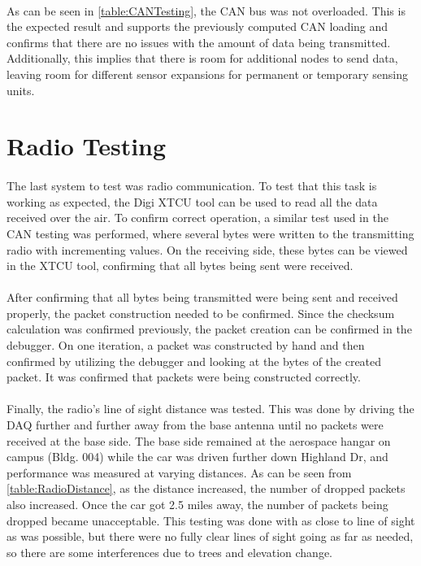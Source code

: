 \paragraph{}
As can be seen in \cref{table:CANTesting}, the CAN bus was not overloaded.
This is the expected result and supports the previously computed CAN loading and confirms that there are no issues with the amount of data being transmitted.
Additionally, this implies that there is room for additional nodes to send data, leaving room for different sensor expansions for permanent or temporary sensing units.

\section{Radio Testing}

\paragraph{}
The last system to test was radio communication.
To test that this task is working as expected, the Digi XTCU tool can be used to read all the data received over the air.
To confirm correct operation, a similar test used in the CAN testing was performed, where several bytes were written to the transmitting radio with incrementing values.
On the receiving side, these bytes can be viewed in the XTCU tool, confirming that all bytes being sent were received.

\paragraph{}
After confirming that all bytes being transmitted were being sent and received properly, the packet construction needed to be confirmed.
Since the checksum calculation was confirmed previously, the packet creation can be confirmed in the debugger.
On one iteration, a packet was constructed by hand and then confirmed by utilizing the debugger and looking at the bytes of the created packet.
It was confirmed that packets were being constructed correctly.

\paragraph{}
Finally, the radio's line of sight distance was tested.
This was done by driving the DAQ further and further away from the base antenna until no packets were received at the base side.
The base side remained at the aerospace hangar on campus (Bldg. 004) while the car was driven further down Highland Dr, and performance was measured at varying distances.
As can be seen from \cref{table:RadioDistance}, as the distance increased, the number of dropped packets also increased.
Once the car got 2.5 miles away, the number of packets being dropped became unacceptable.
This testing was done with as close to line of sight as was possible, but there were no fully clear lines of sight going as far as needed, so there are some interferences due to trees and elevation change.


